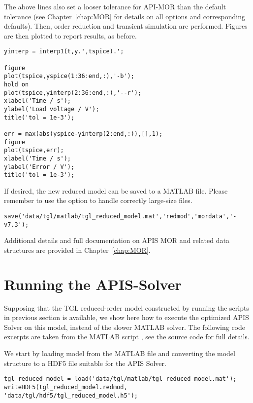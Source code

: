The above lines also set a looser tolerance for API-MOR than the default tolerance (see Chapter~\ref{chap:MOR} for details on all options and corresponding defaults). Then, order reduction and transient simulation are performed. Figures are then plotted to report results, as before.

\begin{lstlisting}[numbers=none]
yinterp = interp1(t,y.',tspice).';

figure
plot(tspice,yspice(1:36:end,:),'-b');
hold on
plot(tspice,yinterp(2:36:end,:),'--r');
xlabel('Time / s');
ylabel('Load voltage / V');
title('tol = 1e-3');

err = max(abs(yspice-yinterp(2:end,:)),[],1);
figure
plot(tspice,err);
xlabel('Time / s');
ylabel('Error / V');
title('tol = 1e-3');
\end{lstlisting}

If desired, the new reduced model can be saved to a MATLAB file. Please remember to use the option  to handle correctly large-size files.

\begin{lstlisting}[numbers=none]
save('data/tgl/matlab/tgl_reduced_model.mat','redmod','mordata','-v7.3');
\end{lstlisting}

Additional details and full documentation on APIS MOR and related data structures are provided in Chapter~\ref{chap:MOR}.

\section{Running the APIS-Solver}\label{sec:solver-quick-start}

Supposing that the TGL reduced-order model constructed by running the scripts in previous section is available, we show here how to execute the optimized APIS Solver on this model, instead of the slower MATLAB solver. The following code excerpts are taken from the MATLAB script , see the source code for full details.

We start by loading model from the MATLAB file and converting the model structure to a HDF5 file suitable for the APIS Solver.

\begin{lstlisting}[numbers=none]
tgl_reduced_model = load('data/tgl/matlab/tgl_reduced_model.mat');
writeHDF5(tgl_reduced_model.redmod, 'data/tgl/hdf5/tgl_reduced_model.h5');
\end{lstlisting}

